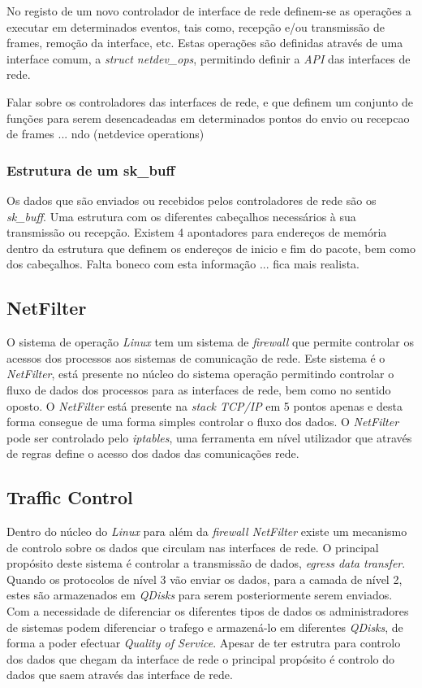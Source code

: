 No registo de um novo controlador de interface de rede definem-se as operações a executar em determinados eventos, tais como, recepção e/ou transmissão de frames, remoção da interface, etc.
 Estas operações são definidas através de uma interface comum, a \textit{struct netdev\_ops}, permitindo definir a \textit{API} das interfaces de rede.

 Falar sobre os controladores das interfaces de rede, e que definem um conjunto de funções para serem desencadeadas em determinados pontos do envio ou recepcao de frames ... ndo (netdevice operations) 
 
\subsubsection{Estrutura de um sk\_buff}
\label{subsub:sk_buff}
 Os dados que são enviados ou recebidos pelos controladores de rede são os \textit{sk\_buff}. Uma estrutura com os diferentes cabeçalhos necessários à sua transmissão ou recepção.
 Existem 4 apontadores para endereços de memória dentro da estrutura que definem os endereços de inicio e fim do pacote, bem como dos cabeçalhos.
 Falta boneco com esta informação ... fica mais realista.
 

\subsection{NetFilter}

O sistema de operação \textit{Linux} tem um sistema de \textit{firewall} que permite controlar os acessos dos processos aos sistemas de comunicação de rede.
 Este sistema é o \textit{NetFilter}, está presente no núcleo do sistema operação permitindo controlar o fluxo de dados dos processos para as interfaces de rede, bem como no sentido oposto.
 O \textit{NetFilter} está presente na \textit{stack TCP/IP} em 5 pontos apenas e desta forma consegue de uma forma simples controlar o fluxo dos dados.
 O \textit{NetFilter} pode ser controlado pelo \textit{iptables}, uma ferramenta em nível utilizador que através de regras define o acesso dos dados das comunicações rede.

\subsection{Traffic Control}
 Dentro do núcleo do \textit{Linux} para além da \textit{firewall NetFilter} existe um mecanismo de controlo sobre os dados que circulam nas interfaces de rede.
 O principal propósito deste sistema é controlar a transmissão de dados, \textit{egress data transfer}.
 Quando os protocolos de nível 3 vão enviar os dados, para a camada de nível 2, estes são armazenados em \textit{QDisks} para serem posteriormente serem enviados.
 Com a necessidade de diferenciar os diferentes tipos de dados os administradores de sistemas podem diferenciar o trafego e armazená-lo em diferentes \textit{QDisks}, de forma a poder efectuar \textit{Quality of Service}.
Apesar de ter estrutra para controlo dos dados que chegam da interface de rede o principal propósito é controlo do dados que saem através das interface de rede.



